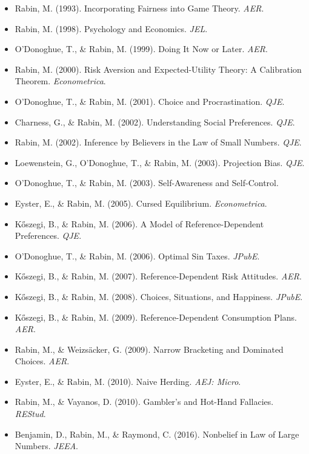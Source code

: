 \begin{itemize}
    \item Rabin, M. (1993). Incorporating Fairness into Game Theory. \textit{AER}.
    \item Rabin, M. (1998). Psychology and Economics. \textit{JEL}.
    \item O'Donoghue, T., \& Rabin, M. (1999). Doing It Now or Later. \textit{AER}.
    \item Rabin, M. (2000). Risk Aversion and Expected-Utility Theory: A Calibration Theorem. \textit{Econometrica}.
    \item O'Donoghue, T., \& Rabin, M. (2001). Choice and Procrastination. \textit{QJE}.
    \item Charness, G., \& Rabin, M. (2002). Understanding Social Preferences. \textit{QJE}.
    \item Rabin, M. (2002). Inference by Believers in the Law of Small Numbers. \textit{QJE}.
    \item Loewenstein, G., O'Donoghue, T., \& Rabin, M. (2003). Projection Bias. \textit{QJE}.
    \item O'Donoghue, T., \& Rabin, M. (2003). Self-Awareness and Self-Control.
    \item Eyster, E., \& Rabin, M. (2005). Cursed Equilibrium. \textit{Econometrica}.
    \item Kőszegi, B., \& Rabin, M. (2006). A Model of Reference-Dependent Preferences. \textit{QJE}.
    \item O'Donoghue, T., \& Rabin, M. (2006). Optimal Sin Taxes. \textit{JPubE}.
    \item Kőszegi, B., \& Rabin, M. (2007). Reference-Dependent Risk Attitudes. \textit{AER}.
    \item Kőszegi, B., \& Rabin, M. (2008). Choices, Situations, and Happiness. \textit{JPubE}.
    \item Kőszegi, B., \& Rabin, M. (2009). Reference-Dependent Consumption Plans. \textit{AER}.
    \item Rabin, M., \& Weizsäcker, G. (2009). Narrow Bracketing and Dominated Choices. \textit{AER}.
    \item Eyster, E., \& Rabin, M. (2010). Naive Herding. \textit{AEJ: Micro}.
    \item Rabin, M., \& Vayanos, D. (2010). Gambler's and Hot-Hand Fallacies. \textit{REStud}.
    \item Benjamin, D., Rabin, M., \& Raymond, C. (2016). Nonbelief in Law of Large Numbers. \textit{JEEA}.
\end{itemize}


